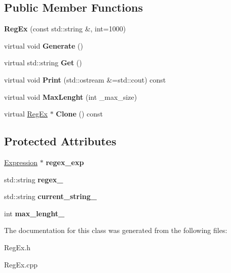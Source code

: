 \subsection*{Public Member Functions}
\begin{DoxyCompactItemize}
\item 
\mbox{\label{class_reg_ex_a7b5051ee106f62bc682bdb6060ebbda3}} 
{\bfseries Reg\+Ex} (const std\+::string \&, int=1000)
\item 
\mbox{\label{class_reg_ex_afd916615e5ad551dc487489be89bee1e}} 
virtual void {\bfseries Generate} ()
\item 
\mbox{\label{class_reg_ex_a049ff6ccf8e7ce6fe03d08dc37318867}} 
virtual std\+::string {\bfseries Get} ()
\item 
\mbox{\label{class_reg_ex_a6ace1d67d2958a15f0d9b88b11fe330c}} 
virtual void {\bfseries Print} (std\+::ostream \&=std\+::cout) const
\item 
\mbox{\label{class_reg_ex_a3b10fe7fa64453168762bd06d2af748d}} 
virtual void {\bfseries Max\+Lenght} (int \+\_\+max\+\_\+size)
\item 
\mbox{\label{class_reg_ex_a1c31c684cfa651d5954c0f8ec054d844}} 
virtual \hyperlink{class_reg_ex}{Reg\+Ex} $\ast$ {\bfseries Clone} () const
\end{DoxyCompactItemize}
\subsection*{Protected Attributes}
\begin{DoxyCompactItemize}
\item 
\mbox{\label{class_reg_ex_af928b29986284f40a2859c2953084ea2}} 
\hyperlink{class_reg_ex_1_1_expression}{Expression} $\ast$ {\bfseries regex\+\_\+exp}
\item 
\mbox{\label{class_reg_ex_af11c2a0136d196abea09421b70bd6309}} 
std\+::string {\bfseries regex\+\_\+}
\item 
\mbox{\label{class_reg_ex_a04ecf5608b4ec9509ab0b9392b32ba1f}} 
std\+::string {\bfseries current\+\_\+string\+\_\+}
\item 
\mbox{\label{class_reg_ex_a215472f429e78fab0fee7c6deac05928}} 
int {\bfseries max\+\_\+lenght\+\_\+}
\end{DoxyCompactItemize}


The documentation for this class was generated from the following files\+:\begin{DoxyCompactItemize}
\item 
Reg\+Ex.\+h\item 
Reg\+Ex.\+cpp\end{DoxyCompactItemize}
